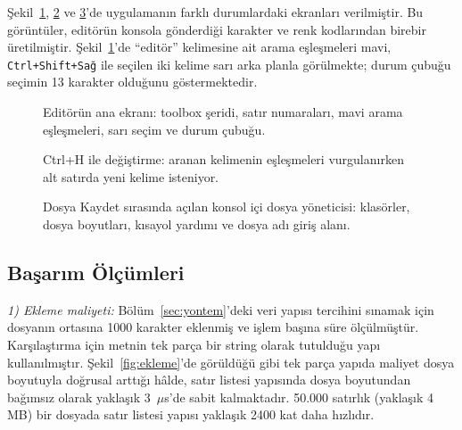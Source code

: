 \documentclass[conference,a4paper]{IEEEtran}
\newcommand{\kod}[1]{\texttt{#1}}
\newcommand{\ekran}[2]{%
  {\setlength{\fboxsep}{3pt}\colorbox{tblack}{%
    \fontsize{#2}{#2}\selectfont\ttfamily\vbox{\offinterlineskip}}}}
\begin{document}
Şekil~\ref{fig:ekran-editor}, \ref{fig:ekran-replace} ve \ref{fig:ekran-fm}'de uygulamanın farklı durumlardaki ekranları verilmiştir. Bu görüntüler, editörün konsola gönderdiği karakter ve renk kodlarından birebir üretilmiştir. Şekil~\ref{fig:ekran-editor}'de ``editör'' kelimesine ait arama eşleşmeleri mavi, \kod{Ctrl+Shift+Sağ} ile seçilen iki kelime sarı arka planla görülmekte; durum çubuğu seçimin 13 karakter olduğunu göstermektedir.

\begin{figure}[t]
\centering
\ekran{shot_editor.tex}{7.2pt}
\caption{Editörün ana ekranı: toolbox şeridi, satır numaraları, mavi arama eşleşmeleri, sarı seçim ve durum çubuğu.}
\label{fig:ekran-editor}
\end{figure}

\begin{figure}[t]
\centering
\ekran{shot_replace.tex}{7.2pt}
\caption{Ctrl+H ile değiştirme: aranan kelimenin eşleşmeleri vurgulanırken alt satırda yeni kelime isteniyor.}
\label{fig:ekran-replace}
\end{figure}

\begin{figure}[t]
\centering
\ekran{shot_fm.tex}{7.2pt}
\caption{Dosya Kaydet sırasında açılan konsol içi dosya yöneticisi: klasörler, dosya boyutları, kısayol yardımı ve dosya adı giriş alanı.}
\label{fig:ekran-fm}
\end{figure}

\subsection{Başarım Ölçümleri}

\textit{1) Ekleme maliyeti:} Bölüm~\ref{sec:yontem}'deki veri yapısı tercihini sınamak için dosyanın ortasına 1000 karakter eklenmiş ve işlem başına süre ölçülmüştür. Karşılaştırma için metnin tek parça bir string olarak tutulduğu yapı kullanılmıştır. Şekil~\ref{fig:ekleme}'de görüldüğü gibi tek parça yapıda maliyet dosya boyutuyla doğrusal arttığı hâlde, satır listesi yapısında dosya boyutundan bağımsız olarak yaklaşık 3~$\mu$s'de sabit kalmaktadır. 50.000 satırlık (yaklaşık 4 MB) bir dosyada satır listesi yapısı yaklaşık 2400 kat daha hızlıdır.
\end{document}
